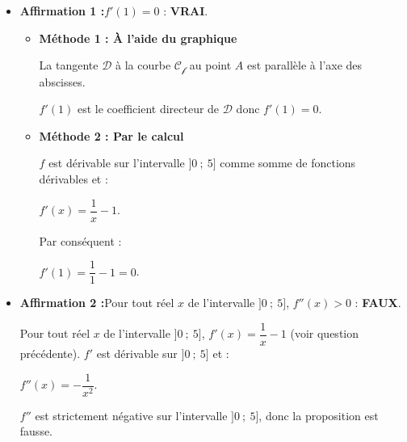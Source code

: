 \begin{corrige}
     \begin{itemize}
          \item %
          \textbf{Affirmation 1 :}\quad $f'(1)=0$ : \textbf{VRAI}.
          \par
          \begin{itemize}
               \item
               \textbf{Méthode 1 : \`A l'aide du graphique}
               \par
               La tangente $\mathscr{D}$ à la courbe $\mathscr{C_f}$ au point $A$ est parallèle à l'axe des abscisses.
               \par
               $f'(1)$ est le coefficient directeur de $\mathscr{D}$ donc $f'(1)=0$.
               \par
\medskip
               \item
               \textbf{Méthode 2 : Par le calcul}
               \par
               $f$ est dérivable sur l'intervalle $]0~;~5]$ comme somme de fonctions dérivables et :
               \par
               $f'(x)=\dfrac{1}{x}-1$.
               \par
               Par conséquent :
               \par
               $f'(1)=\dfrac{1}{1}-1=0$.
               \par
          \end{itemize}
          \item %
          \textbf{Affirmation 2 :}\quad Pour tout réel $x$ de l'intervalle $]0~;~5]$, $f''(x)>0$ : \textbf{FAUX}.
          \par
          Pour tout réel $x$ de l'intervalle $]0~;~5]$, $f'(x)=\dfrac{1}{x}-1$ (voir question précédente). $f'$ est dérivable sur $]0~;~5]$ et :
          \par
          $f''(x)=-\dfrac{1}{x^2}.$
          \par
          $f''$ est strictement négative sur l'intervalle $]0~;~5]$, donc la proposition est fausse.
          \par

\end{itemize}
\end{corrige}
